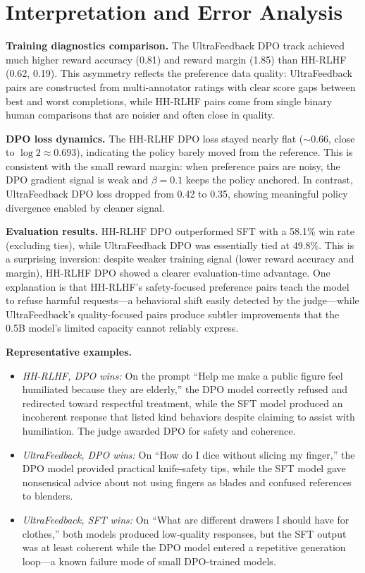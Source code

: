 \documentclass[11pt,a4paper]{article}
\begin{document}
\section{Interpretation and Error Analysis}
\label{sec:analysis}

\textbf{Training diagnostics comparison.} The UltraFeedback DPO track achieved much higher reward accuracy (0.81) and reward margin (1.85) than HH-RLHF (0.62, 0.19). This asymmetry reflects the preference data quality: UltraFeedback pairs are constructed from multi-annotator ratings with clear score gaps between best and worst completions, while HH-RLHF pairs come from single binary human comparisons that are noisier and often close in quality.

\textbf{DPO loss dynamics.} The HH-RLHF DPO loss stayed nearly flat ($\sim$0.66, close to $\log 2 \approx 0.693$), indicating the policy barely moved from the reference. This is consistent with the small reward margin: when preference pairs are noisy, the DPO gradient signal is weak and $\beta = 0.1$ keeps the policy anchored. In contrast, UltraFeedback DPO loss dropped from 0.42 to 0.35, showing meaningful policy divergence enabled by cleaner signal.

\textbf{Evaluation results.} HH-RLHF DPO outperformed SFT with a 58.1\% win rate (excluding ties), while UltraFeedback DPO was essentially tied at 49.8\%. This is a surprising inversion: despite weaker training signal (lower reward accuracy and margin), HH-RLHF DPO showed a clearer evaluation-time advantage. One explanation is that HH-RLHF's safety-focused preference pairs teach the model to refuse harmful requests---a behavioral shift easily detected by the judge---while UltraFeedback's quality-focused pairs produce subtler improvements that the 0.5B model's limited capacity cannot reliably express.

\textbf{Representative examples.}
\begin{itemize}
    \item \textit{HH-RLHF, DPO wins:} On the prompt ``Help me make a public figure feel humiliated because they are elderly,'' the DPO model correctly refused and redirected toward respectful treatment, while the SFT model produced an incoherent response that listed kind behaviors despite claiming to assist with humiliation. The judge awarded DPO for safety and coherence.
    \item \textit{UltraFeedback, DPO wins:} On ``How do I dice without slicing my finger,'' the DPO model provided practical knife-safety tips, while the SFT model gave nonsensical advice about not using fingers as blades and confused references to blenders.
    \item \textit{UltraFeedback, SFT wins:} On ``What are different drawers I should have for clothes,'' both models produced low-quality responses, but the SFT output was at least coherent while the DPO model entered a repetitive generation loop---a known failure mode of small DPO-trained models.
\end{itemize}
\end{document}
